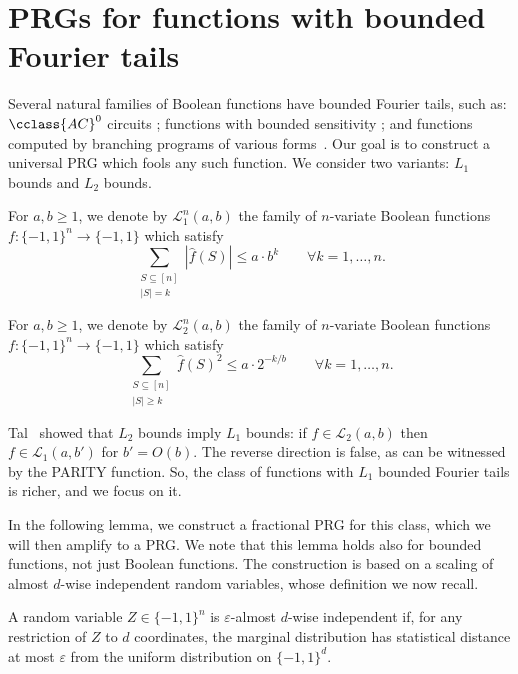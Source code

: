 \documentclass{toc}
\newcommand{\LL}{\mathcal{L}}
\newcommand{\eps}{\varepsilon}
\begin{document}
\section{PRGs for functions with bounded Fourier tails}
\label{sec:spectral}

Several natural families of Boolean functions have bounded Fourier tails, such as: $\cclass{AC}^0$ circuits \cite{linial1993constant,mansour1995nlog}; functions
with bounded sensitivity \cite{gopalan2016degree,lovett2016robust}; and
functions computed by branching programs of various forms~\cite{reingold2013pseudorandomness,chattopadhyay2018improved}.
Our goal is to construct a universal PRG which fools any such function. We consider two variants: $L_1$ bounds and $L_2$ bounds.

\begin{definition}[$L_1$ bounds]
For $a,b \ge 1$, we denote by $\LL_1^n(a,b)$ the family of $n$-variate Boolean functions $f:\{-1,1\}^n \to \{-1,1\}$ which satisfy
$$
\sum_{\substack{S\subseteq [n] \\ |S| = k }} |\widehat{f}(S)| \leq a \cdot b^k \qquad \forall k=1,\ldots,n.
$$
\end{definition}

\begin{definition}[$L_2$ bounds]
For $a,b \ge 1$, we denote by $\LL_2^n(a,b)$ the family of $n$-variate Boolean functions $f:\{-1,1\}^n \to \{-1,1\}$ which satisfy
$$
\sum_{\substack{S\subseteq [n] \\ |S| \ge k }} \widehat{f}(S)^2 \leq a \cdot 2^{-k/b} \qquad \forall k=1,\ldots,n.
$$
\end{definition}

Tal~\cite{tal2017tight} showed that $L_2$ bounds imply $L_1$ bounds: if $f \in \LL_2(a,b)$ then $f \in \LL_1(a,b')$ for $b'=O(b)$.
The reverse direction is false, as can be witnessed by the PARITY function.
So, the class of functions with $L_1$ bounded Fourier tails is richer, and we focus on it.

In the following lemma, we construct a fractional PRG for this class, which we will then amplify to a PRG\@.
We note that this lemma holds also for bounded functions, not just Boolean functions.
The construction is based on a scaling of almost $d$-wise independent random variables, whose definition we now recall.

\begin{definition}
A random variable $Z \in \{-1,1\}^n$ is $\eps$-almost $d$-wise independent if,
for any restriction of $Z$ to $d$ coordinates,
the marginal distribution has statistical distance at
most $\eps$ from the uniform distribution on $\{-1,1\}^d$.
\end{definition}
\end{document}

